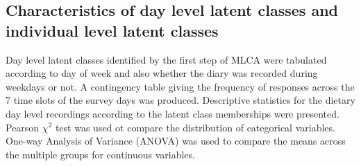 %
%
%



\subsection{Characteristics of day level latent classes and individual level latent classes}\vspace{-0.3cm}


Day level latent classes identified by the first step of MLCA were tabulated according to day of week and also whether the diary was recorded during weekdays or not. A contingency table giving the frequency of responses across the 7 time slots of the survey days was produced. Descriptive statistics for the dietary day level recordings according to the latent class memberships were presented. Pearson $\chi^2$ test was used ot compare the distribution of categorical variables. One-way Analysis of Variance (ANOVA) was used to compare the means across the multiple groups for continuous variables.

